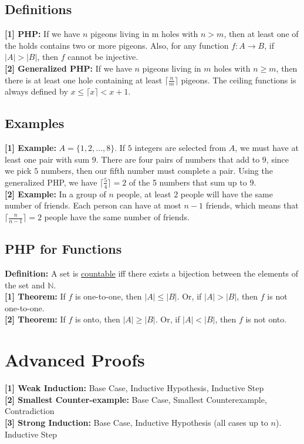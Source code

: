 \subsection{Definitions}
\textbf{[1] PHP:} If we have $n$ pigeons living in m holes with $n > m$, then at least one of the holds contains two or more pigeons. Also, for any function $f: A \rightarrow B$, if $|A| > |B|$, then $f$ cannot be injective.\\
\textbf{[2] Generalized PHP:} If we have $n$ pigeons living in $m$ holes with $n \geq m$, then there is at least one hole containing at least $\lceil\frac{n}{m} \rceil$ pigeons. The ceiling functions is always defined by $x \leq \lceil x \rceil < x+1$.
\subsection{Examples}
\textbf{[1] Example:} $A = \{1,2,\dots,8\}$. If $5$ integers are selected from $A$, we must have at least one pair with sum $9$. There are four pairs of numbers that add to $9$, since we pick $5$ numbers, then our fifth number must complete a pair. Using the generalized PHP, we have $\lceil \frac{5}{4} \rceil = 2$ of the 5 numbers that sum up to $9$.\\
\textbf{[2] Example:} In a group of $n$ people, at least $2$ people will have the same number of friends. Each person can have at most $n-1$ friends, which means that $\lceil \frac{n}{n-1} \rceil = 2$ people have the same number of friends.
\subsection{PHP for Functions}
\textbf{Definition:} A set is \underline{countable} iff there exists a bijection between the elements of the set and $\mathbb{N}$.\\
\textbf{[1] Theorem:} If $f$ is one-to-one, then $|A| \leq |B|$. Or, if $|A| > |B|$, then $f$ is not one-to-one.\\
\textbf{[2] Theorem:} If $f$ is onto, then $|A| \geq |B|$. Or, if $|A| < |B|$, then $f$ is not onto. 
\section{Advanced Proofs}
\textbf{[1] Weak Induction:} Base Case, Inductive Hypothesis, Inductive Step\\
\textbf{[2] Smallest Counter-example:} Base Case, Smallest Counterexample, Contradiction\\
\textbf{[3] Strong Induction:} Base Case, Inductive Hypothesis (all cases up to $n$). Inductive Step
